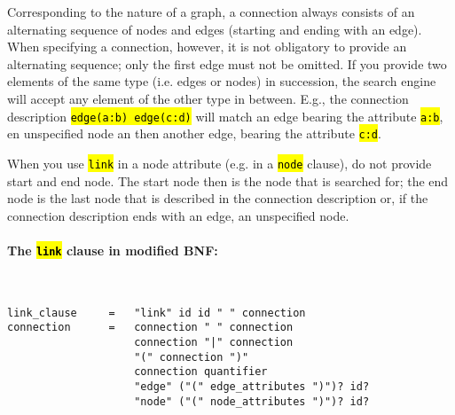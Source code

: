 \documentclass[12pt]{scrartcl}
\newcommand{\code}[1]{\hl{\texttt{#1}}}
\begin{document}
Corresponding to the nature of a graph, a connection always consists of an alternating sequence of nodes and edges (starting and ending with an edge).
When specifying a connection, however, it is not obligatory to provide an alternating sequence; only the first edge must not be omitted.
If you provide two elements of the same type (i.e. edges or nodes) in succession, the search engine will accept any element of the other type in between.
E.g., the connection description \code{edge(a:b) edge(c:d)} will match an edge bearing the attribute \code{a:b}, en unspecified node an then another edge, bearing the attribute \code{c:d}.

When you use \code{link} in a node attribute (e.g. in a \code{node} clause), do not provide start and end node.
The start node then is the node that is searched for; the end node is the last node that is described in the connection description or, if the connection description ends with an edge, an unspecified node.


\paragraph*{The \code{link} clause in modified BNF:}
~
\begin{lstlisting}
link_clause     =   "link" id id " " connection
connection      =   connection " " connection
                    connection "|" connection
                    "(" connection ")"
                    connection quantifier
                    "edge" ("(" edge_attributes ")")? id?
                    "node" ("(" node_attributes ")")? id?
\end{lstlisting}
\end{document}
